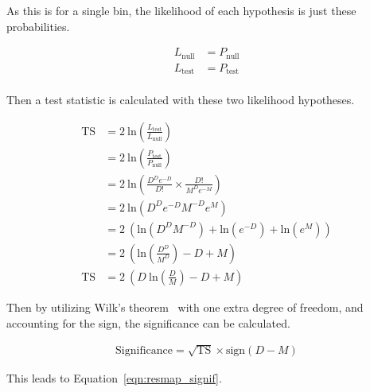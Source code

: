   As this is for a single bin, the likelihood of each hypothesis is just these probabilities.
  
  \begin{equation}
    \begin{split}
      L_{\textrm{null}} & = P_{\textrm{null}} \\
      L_{\textrm{test}} & = P_{\textrm{test}} \\
    \end{split}
  \end{equation}
  
  Then a test statistic is calculated with these two likelihood hypotheses.
  
  \begin{equation}
    \begin{split}
      \textrm{TS} & = 2 \: \textrm{ln} \left ( \frac{ L_{\textrm{test}} }{ L_{\textrm{null}}    } \right ) \\
                  & = 2 \: \textrm{ln} \left ( \frac{ P_{\textrm{test}} }{ P_{\textrm{null}}    } \right ) \\
                  & = 2 \: \textrm{ln} \left ( \frac{D^D e^{-D}}{D!} \times \frac{D!}{M^D e^{-M}} \right ) \\
                  & = 2 \: \textrm{ln} \left ( D^D e^{-D} M^{-D} e^M                              \right ) \\
                  & = 2 \: \left (      \textrm{ln} \left ( D^D M^{-D} \right ) + \textrm{ln} \left ( e^{-D} \right ) + \textrm{ln} \left ( e^M  \right )\right ) \\
                  & = 2 \: \left (      \textrm{ln} \left (  \frac{D^D}{M^D} \right ) -D + M \right ) \\
      \textrm{TS} & = 2 \: \left ( D \: \textrm{ln} \left (  \frac{D  }{M  } \right ) -D + M \right )
    \end{split}
  \end{equation}
  
  Then by utilizing Wilk's theorem~\cite{wilks1938} with one extra degree of freedom, and accounting for the sign, the significance can be calculated.
    
  \begin{equation}
    \begin{split}
      \textrm{Significance} = \sqrt{\textrm{TS}} \times \textrm{sign} \left ( D - M \right )
    \end{split}
  \end{equation}
  
  This leads to Equation~\ref{eqn:resmap_signif}.
  
